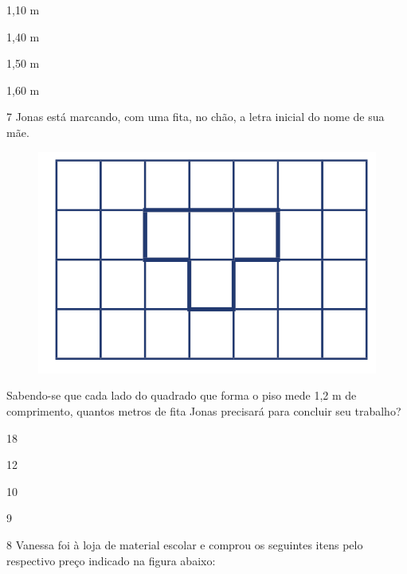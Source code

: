 \begin{minipage}{.5\textwidth}
\begin{escolha}
\item
  1,10 m
\item
  1,40 m
\item
  1,50 m
\item
  1,60 m
\end{escolha}
\end{minipage}


\num{7} Jonas está marcando, com uma fita, no chão, a letra inicial
do nome de sua mãe.

\begin{figure}[htpb!]
\centering
\includegraphics[width=.5\textwidth]{../ilustracoes/MAT5/SAEB_5ANO_MAT_figura118.png}
\end{figure}

Sabendo-se que cada lado do quadrado que forma o piso mede 1,2 m de
comprimento, quantos metros de fita Jonas precisará para concluir seu
trabalho?

\begin{minipage}{.5\textwidth}
\begin{escolha}
\item
  18
\item
  12
\item
  10
\item
  9
\end{escolha}
\end{minipage}

\num{8} Vanessa foi à loja de material escolar e comprou os seguintes
itens pelo respectivo preço indicado na figura abaixo:

